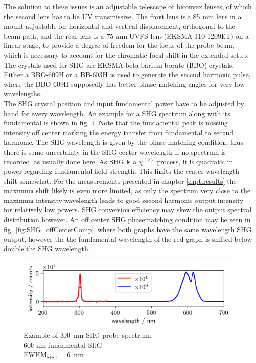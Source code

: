 \documentclass[twoside,openright,listof=numbered]{scrreprt}
\begin{document}
The solution to these issues is an adjustable telescope of biconvex lenses, of which the second lens has to be UV transmissive. The front lens is a 85 mm lens in a mount adjustable for horizontal and vertical displacement, orthogonal to the beam path, and the rear lens is a 75 mm UVFS lens (EKSMA 110-1209ET) on a linear stage, to provide a degree of freedom for the focus of the probe beam, which is necessary to account for the chromatic focal shift in the extended setup. The crystals used for SHG are EKSMA beta barium borate (BBO) crystals. Either a BBO-609H or a BB-603H is used to generate the second harmonic pulse, where the BBO-609H supposedly has better phase matching angles for very low wavelengths.\\
The SHG crystal position and input fundamental power have to be adjusted by hand for every wavelength. An example for a SHG spectrum along with its fundamental is shown in fig. \ref{fig:specSHG300nm}. Note that the fundamental peak is missing intensity off center marking the energy transfer from fundamental to second harmonic. The SHG wavelength is given by the phase-matching condition, thus there is some uncertainty in the SHG center wavelength if no spectrum is recorded, as usually done here. As SHG is a $\chi^{\left(2\right)}$ process, it is quadratic in power regarding fundamental field strength. This limits the center wavelength shift somewhat. For the measurements presented in chapter \ref{chpt:results} the maximum shift likely is even more limited, as only the spectrum very close to the maximum intensity wavelength leads to good second harmonic output intensity for relatively low powers. SHG conversion efficiency may skew the output spectral distribution however. An off center SHG phasematching condition may be seen in fig. \ref{fig:SHG_offCenterComp}, where both graphs have the same wavelength SHG output, however the the fundamental wavelength of the red graph is shifted below double the SHG wavelength. 
\begin{figure}[hbtp]
\centering
\includegraphics[scale=1]{images/spectra/SpectrumExampleNoFilter_300nm.png}
\caption[Example of \qty{300}{\nano\meter} SHG probe spectrum.]{Example of \qty{300}{\nano\meter} SHG probe spectrum.\\600 nm fundamental SHG\label{fig:specSHG300nm}\\ FWHM$_\text{SHG}$ = \SI{6}{\nano\meter}}
\end{figure}
\end{document}
